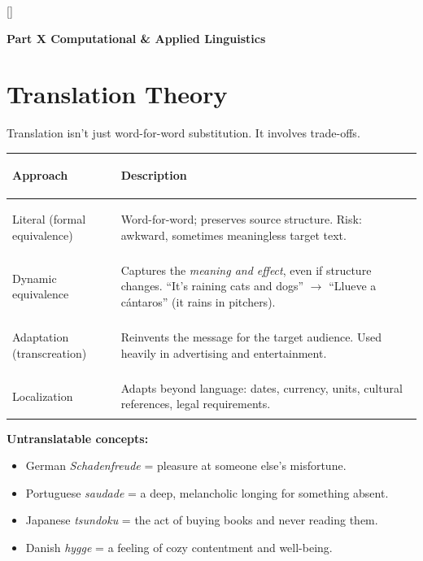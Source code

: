 \documentclass[11pt, letterpaper]{article}
\newcommand{\greensections}{%
  \titleformat{\section}{\large\bfseries\color{sectiongreen}}{}{0em}{}[\color{sectiongreen}\titlerule]%
  \titleformat{\subsection}{\normalsize\bfseries\color{sectiongreen!80!black}}{}{0em}{}%
}
\newcommand{\partbanner}[3]{%
  \begin{tcolorbox}[colback=#1, colframe=#2, boxrule=1.2pt, arc=4pt,
    left=8pt, right=8pt, top=6pt, bottom=6pt]
    \begin{center}{\LARGE\bfseries #3}\end{center}
  \end{tcolorbox}%
}
\begin{document}
\newpage

\greensections
{}
\partbanner{part2bg}{sectiongreen}{Part X \quad Computational \& Applied Linguistics}

\vspace{8pt}

\section*{Translation Theory}

Translation isn't just word-for-word substitution. It involves trade-offs.

\noindent
{\renewcommand{\arraystretch}{1.5}
\begin{tabularx}{\textwidth}{>{\bfseries\raggedright\arraybackslash}p{3.5cm}
                              >{\raggedright\arraybackslash}X}
\toprule
\rowcolor{tableheadergreen}
\textbf{Approach} & \textbf{Description} \\
\midrule
\rowcolor{rowA}  Literal (formal equivalence) & Word-for-word; preserves source structure. Risk: awkward, sometimes meaningless target text. \\
\rowcolor{rowBg} Dynamic equivalence          & Captures the \emph{meaning and effect}, even if structure changes. ``It's raining cats and dogs'' $\to$ ``Llueve a c\'antaros'' (it rains in pitchers). \\
\rowcolor{rowA}  Adaptation (transcreation)   & Reinvents the message for the target audience. Used heavily in advertising and entertainment. \\
\rowcolor{rowBg} Localization                 & Adapts beyond language: dates, currency, units, cultural references, legal requirements. \\
\bottomrule
\end{tabularx}}

\textbf{Untranslatable concepts:}
\begin{itemize}[noitemsep]
  \item German \emph{Schadenfreude} = pleasure at someone else's misfortune.
  \item Portuguese \emph{saudade} = a deep, melancholic longing for something absent.
  \item Japanese \emph{tsundoku} = the act of buying books and never reading them.
  \item Danish \emph{hygge} = a feeling of cozy contentment and well-being.
\end{itemize}
\end{document}
